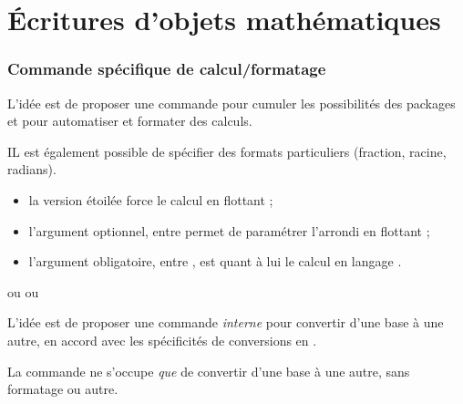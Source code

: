 \part{Écritures d'objets mathématiques}\label{ecrituresmath}

\section{Commande spécifique de calcul/formatage}\label{pflnum}

\begin{tipblock}
 L'idée est de proposer une commande pour cumuler les possibilités des packages  et  pour automatiser et formater des calculs.

 IL est également possible de spécifier des formats particuliers (fraction, racine, radians).

\begin{itemize}
	\item la version étoilée force le calcul en flottant ;
	\item l'argument optionnel, entre \ctex{[...]} permet de paramétrer l'arrondi en flottant ;
	\item l'argument obligatoire, entre , est quant à lui le calcul en langage .
\end{itemize}
\vspace*{-\baselineskip}\leavevmode
\end{tipblock}

\begin{PresCodeTexPL}{}




 

 ou  ou 

\end{PresCodeTexPL}

\begin{tipblock}
 L'idée est de proposer une commande \textit{interne} pour convertir d'une base à une autre, en accord avec les spécificités de conversions en .

\smallskip

La commande ne s'occupe \textit{que} de convertir d'une base à une autre, sans formatage ou autre.
\end{tipblock}

